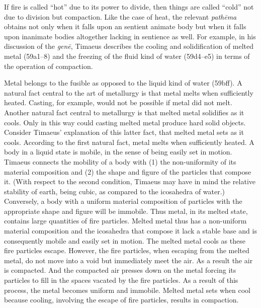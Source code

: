 If fire is called ``hot'' due to its power to divide, then things are called ``cold'' not due to division but compaction. Like the case of heat, the relevant \emph{pathēma} obtains not only when it falls upon an sentient animate body but when it falls upon inanimate bodies altogether lacking in sentience as well. For example, in his discussion of the \emph{genē}, Timaeus describes the cooling and solidification of melted metal (59a1--8) and the freezing of the fluid kind of water (59d4--e5) in terms of the operation of compaction. 

Metal belongs to the fusible as opposed to the liquid kind of water (59bff). A natural fact central to the art of metallurgy is that metal melts when sufficiently heated. Casting, for example, would not be possible if metal did not melt. Another natural fact central to metallurgy is that melted metal solidifies as it cools. Only in this way could casting melted metal produce hard solid objects. Consider Timaeus' explanation of this latter fact, that melted metal sets as it cools. According to the first natural fact, metal melts when sufficiently heated. A body in a liquid state is mobile, in the sense of being easily set in motion. Timaeus connects the mobility of a body with (1) the non-uniformity of its material composition and (2) the shape and figure of the particles that compose it. (With respect to the second condition, Timaeus may have in mind the relative stability of earth, being cubic, as compared to the icosahedra of water.) Conversely, a body with a uniform material composition of particles with the appropriate shape and figure will be immobile. Thus metal, in its melted state, contains large quantities of fire particles. Melted metal thus has a non-uniform material composition and the icosahedra that compose it lack a stable base and is consequently mobile and easily set in motion. The melted metal cools as these fire particles escape. However, the fire particles, when escaping from the melted metal, do not move into a void but immediately meet the air. As a result the air is compacted. And the compacted air presses down on the metal forcing its particles to fill in the spaces vacated by the fire particles. As a result of this process, the metal becomes uniform and immobile. Melted metal sets when cool because cooling, involving the escape of fire particles, results in compaction.


